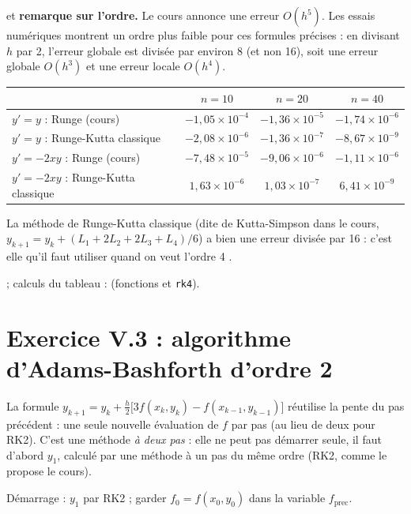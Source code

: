 \Verif et \textbf{remarque sur l'ordre.} Le cours annonce une erreur
$O(h^5)$. Les essais numériques montrent un ordre plus faible pour ces
formules précises : en divisant $h$ par 2, l'erreur globale est divisée par
environ 8 (et non 16), soit une erreur globale $O(h^3)$ et une erreur locale
$O(h^4)$.
\begin{center}
\begin{tabular}{lccc}
  \toprule
  & $n = 10$ & $n = 20$ & $n = 40$\\ \midrule
  $y' = y$ : Runge (cours) & $-1{,}05\times 10^{-4}$ & $-1{,}36\times 10^{-5}$ & $-1{,}74\times 10^{-6}$\\
  $y' = y$ : Runge-Kutta classique & $-2{,}08\times 10^{-6}$ & $-1{,}36\times 10^{-7}$ & $-8{,}67\times 10^{-9}$\\
  $y' = -2xy$ : Runge (cours) & $-7{,}48\times 10^{-5}$ & $-9{,}06\times 10^{-6}$ & $-1{,}11\times 10^{-6}$\\
  $y' = -2xy$ : Runge-Kutta classique & $1{,}63\times 10^{-6}$ & $1{,}03\times 10^{-7}$ & $6{,}41\times 10^{-9}$\\
  \bottomrule
\end{tabular}
\end{center}
La méthode de Runge-Kutta classique (dite de Kutta-Simpson dans le cours,
$y_{k+1} = y_k + (L_1 + 2L_2 + 2L_3 + L_4)/6$) a bien une erreur divisée par 16 :
c'est elle qu'il faut utiliser quand on veut l'ordre 4 .

\Refs {} ; calculs du tableau :
 (fonctions  et
\texttt{rk4}).

\section{Exercice V.3 : algorithme d'Adams-Bashforth d'ordre 2}


\Pourquoi La formule $y_{k+1} = y_k + \tfrac h2\bigl[3f(x_k,y_k) -
f(x_{k-1},y_{k-1})\bigr]$ réutilise la pente du pas précédent : une seule
nouvelle évaluation de $f$ par pas (au lieu de deux pour RK2). C'est une
méthode \emph{à deux pas} : elle ne peut pas démarrer seule, il faut d'abord
$y_1$, calculé par une méthode à un pas du même ordre (RK2, comme le propose le
cours).

\Etapes
{} Démarrage : $y_1$ par RK2 ; garder $f_0 = f(x_0, y_0)$ dans la variable
$f_{\text{prec}}$.


